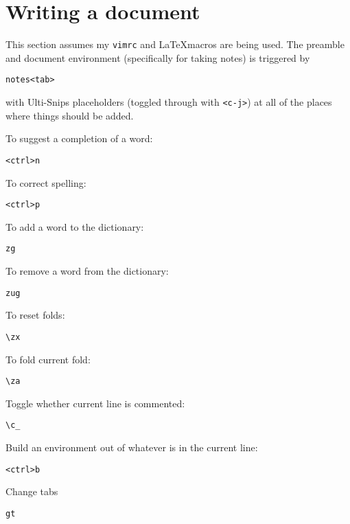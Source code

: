 \documentclass{amsart}
\begin{document}
\section{Writing a document}

This section assumes my \texttt{vimrc} and \LaTeX macros are being used.
The preamble and document environment (specifically for taking notes) is triggered by
\begin{verbatim}
notes<tab>
\end{verbatim}
with Ulti-Snips placeholders (toggled through with \texttt{<c-j>}) 
at all of the places where things should be added. 

To suggest a completion of a word:
\begin{verbatim}
<ctrl>n
\end{verbatim}

To correct spelling:
\begin{verbatim}
<ctrl>p
\end{verbatim}

To add a word to the dictionary:
\begin{verbatim}
zg
\end{verbatim}

To remove a word from the dictionary:
\begin{verbatim}
zug
\end{verbatim}

To reset folds:
\begin{verbatim}
\zx 
\end{verbatim}

To fold current fold:
\begin{verbatim}
\za
\end{verbatim}

Toggle whether current line is commented:
\begin{verbatim}
\c_
\end{verbatim}

Build an environment out of whatever is in the current line:
\begin{verbatim}
<ctrl>b
\end{verbatim}

Change tabs
\begin{verbatim}
gt
\end{verbatim}
\end{document}
